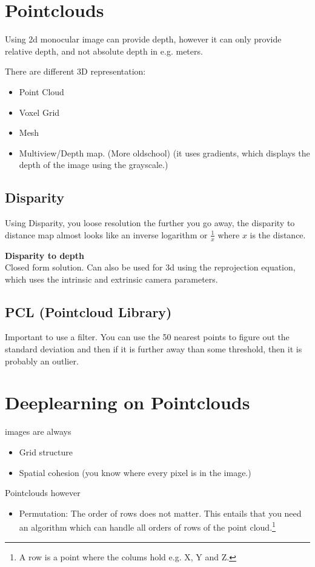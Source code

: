 \documentclass[a4paper]{article}
\begin{document}
\section{Pointclouds}
Using 2d monocular image can provide depth, however it can only provide relative depth, and not absolute depth in e.g. meters. 

There are different 3D representation:
\begin{itemize}
	\item Point Cloud
	\item Voxel Grid
	\item Mesh
	\item Multiview/Depth map. (More oldschool) (it uses gradients, which displays the depth of the image using the grayscale.)
\end{itemize}

\subsection{Disparity}
Using Disparity, you loose resolution the further you go away, the disparity to distance map almost looks like an inverse logarithm or $ \frac{1}{x}  $ where $ x $ is the distance.

\vspace{5pt}

\textbf{Disparity to depth} \\
Closed form solution.
Can also be used for 3d using the reprojection equation, which uses the intrinsic and extrinsic camera parameters.


\subsection{PCL (Pointcloud Library)}
Important to use a filter. You can use the 50 nearest points to figure out the standard deviation and then if it is further away than some  threshold, then it is probably an outlier. 


\section{Deeplearning on Pointclouds}
images are always
\begin{itemize}
	\item Grid structure
	\item Spatial cohesion (you know where every pixel is in the image.)
\end{itemize}

Pointclouds however
\begin{itemize}
	\item Permutation: The order of rows does not matter. This entails that you need an algorithm which can handle all orders of rows of the point cloud.\footnote{A row is a point where the colums hold e.g. X, Y and Z.}
\end{itemize}
\end{document}
